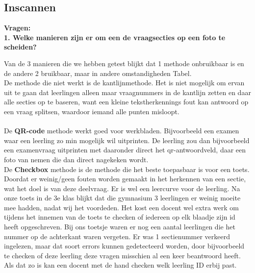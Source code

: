 \documentclass[12pt]{article}
\begin{document}
\subsection{Inscannen}
\textbf{Vragen:}\\
\textbf{1. Welke manieren zijn er om een de vraagsecties op een foto te scheiden?} 
\begin{multicols}{2}
Van de 3 manieren die we hebben getest blijkt dat 1 methode onbruikbaar is en de andere 2 bruikbaar, maar in andere omstandigheden Tabel.\\
De methode die niet werkt is de kantlijnmethode. Het is niet mogelijk om ervan uit te gaan dat leerlingen alleen maar vraagnummers in de kantlijn zetten en daar alle secties op te baseren, want een kleine tekstherkennings fout kan antwoord op een vraag splitsen, waardoor iemand alle punten misloopt. \\
\\
De \textbf{QR-code} methode werkt goed voor werkbladen. Bijvoorbeeld een examen waar een leerling zo min mogelijk wil uitprinten. De leerling zou dan bijvoorbeeld een examenvraag uitprinten met daaronder direct het qr-antwoordveld, daar een foto van nemen die dan direct nagekeken wordt. 
\\
De \textbf{Checkbox} methode is de methode die het beste toepasbaar is voor een toets. Doordat er weinig/geen fouten worden gemaakt in het herkennen van een sectie, wat het doel is van deze deelvraag. Er is wel een leercurve voor de leerling. Na onze toets in de 3e klas blijkt dat die gymnasium 3 leerlingen er weinig moeite mee hadden, nadat wij het voordeden. Het kost een docent wel extra werk om tijdens het innemen van de toets te checken of iedereen op elk blaadje zijn id heeft opgeschreven. Bij ons toetsje waren er nog een aantal leerlingen die het nummer op de achterkant waren vergeten. Er was 1 sectienummer verkeerd ingelezen, maar dat soort errors kunnen gedetecteerd worden, door bijvoorbeeld te checken of deze leerling deze vragen misschien al een keer beantwoord heeft. Als dat zo is kan een docent met de hand checken welk leerling ID erbij past. 

\end{multicols}
\end{document}
